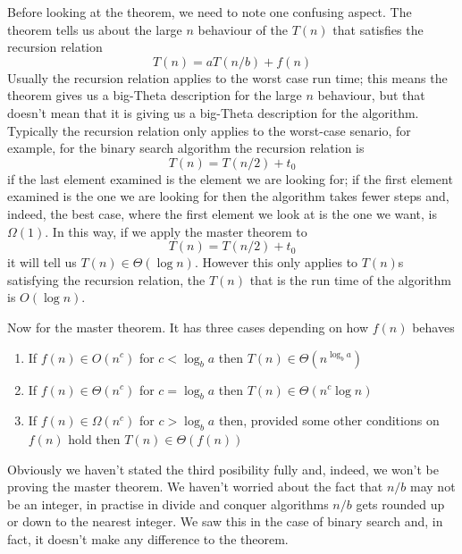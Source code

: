 \documentclass[11pt,a4paper]{scrartcl}
\begin{document}
Before looking at the theorem, we need to note one confusing
aspect. The theorem tells us about the large $n$ behaviour of the $T(n)$ that
satisfies the recursion relation
\begin{equation}
T(n)=aT(n/b)+f(n)
\end{equation}
Usually the recursion relation applies to the worst case run time;
this means the theorem gives us a big-Theta description for the large
$n$ behaviour, but that doesn't mean that it is giving us a big-Theta
description for the algorithm. Typically the recursion relation only
applies to the worst-case senario, for example, for the binary search
algorithm the recursion relation is 
\begin{equation}
T(n)=T(n/2)+t_0
\end{equation}
if the last element examined is the element we are looking for; if the
first element examined is the one we are looking for then the algorithm
takes fewer steps and, indeed, the best case, where the first element
we look at is the one we want, is $\Omega(1)$. In this way, if we
apply the master theorem to 
\begin{equation}
T(n)=T(n/2)+t_0
\end{equation}
it will tell us $T(n)\in \Theta(\log{n})$. However this only applies
to $T(n)$s satisfying the recursion relation, the $T(n)$ that is the
run time of the algorithm is $O(\log{n})$.

Now for the master theorem. It has three cases depending on how $f(n)$ behaves
\begin{enumerate}
\item If $f(n) \in O(n^c)$ for $c<\log_ba$ then $T(n) \in \Theta(n^{\log_ba})$
\item If $f(n) \in \Theta(n^c)$ for $c=\log_ba$ then $T(n) \in \Theta(n^c\log n)$
\item If $f(n) \in \Omega(n^c)$ for $c>\log_ba$ then, provided some other conditions on $f(n)$ hold then $T(n)\in \Theta(f(n))$ 
\end{enumerate}
Obviously we haven't stated the third posibility fully and, indeed, we
won't be proving the master theorem. We haven't worried about the fact
that $n/b$ may not be an integer, in practise in divide and conquer
algorithms $n/b$ gets rounded up or down to the nearest integer. We
saw this in the case of binary search and, in fact, it doesn't make any
difference to the theorem.
\end{document}

